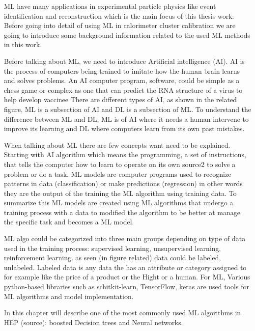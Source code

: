 
ML have many applications in experimental particle physics like event identification and reconstruction which is the main focus of this thesis work.
Before going into detail of using ML in calorimeter cluster calibration we are going to introduce some background information related to the used ML methods in this work.%

Before talking about ML, we need to introduce Artificial intelligence (AI).
AI is the process of computers being trained to imitate how the human brain learns and solves problems. An AI computer program,
software, could be simple as a chess game or complex as one that can predict the RNA structure of a virus to help develop vaccinee%
There are different types of AI, as shown in the related figure, ML is a subsection of AI and DL is a subsection of ML.
To understand the difference between ML and DL, ML is of AI where it needs a human intervene to improve its learning and DL where computers learn from its own past mistakes.

When talking about ML there are few concepts want need to be explained. Starting with AI algorithm which means the programming,
a set of instructions, that tells the computer how to learn to operate on its own source2 to solve a problem or do a task.
ML models are computer programs used to recognize patterns in data (classification) or make predictions (regression) in other words they are the output of the training the ML algorithm using training data.
To summarize this ML models are created using ML algorithms that undergo a training process with a data to modified the algorithm to be better at manage the specific task and becomes a ML model.  %

ML algo could be categorized into three main groups depending on type of data used in the training process: supervised learning, unsupervised learning, reinforcement learning.
as seen (in figure related) data could be labeled, unlabeled. Labeled data is any data the has an attribute or category assigned to for example like the price of a product or the Hight or a human.
For ML, Various python-based libraries such as schitkit-learn, TensorFlow, keras are used tools for ML algorithms and model implementation. 

In this chapter will describe one of the most commonly used ML algorithms in HEP (source):  boosted Decision trees and Neural networks.  


